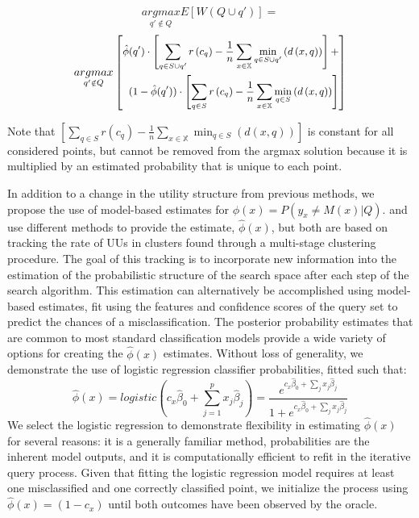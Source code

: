 \documentclass[letterpaper]{article} %
\begin{document}
$$\underset{q' \notin Q}{argmax} E[W(Q \cup q')] = $$
\begin{equation*}
\small
\underset{q' \notin Q}{argmax} \left[\begin{split}
\hat{\phi}(q') \cdot \left[\sum_{q \in S \cup q'} r \left(c_q\right) - \frac{1}{n} \sum_{x \in \mathbb{X}} \min_{q \in S \cup q'}\left(d\left(x,q\right)\right) \right] + \\ 
(1-\hat{\phi}(q')) \cdot \left[\sum_{q \in S} r \left(c_q\right) - \frac{1}{n} \sum_{x \in \mathbb{X}} \min_{q \in S}\left(d\left(x,q\right)\right)\right]  
\end{split}\right]
\end{equation*}
\normalsize

Note that $\left[\sum_{q \in S} r \left(c_q\right) - \frac{1}{n} \sum_{x \in \mathbb{X}} \min_{q \in S}\left(d\left(x,q\right)\right)\right]$ is constant for all considered points, but cannot be removed from the argmax solution because it is multiplied by an estimated probability that is unique to each point. 

In addition to a change in the utility structure from previous methods, we propose the use of model-based estimates for $\phi(x) = P\left(y_x \neq M(x) |Q \right)$. \citet{Lakkaraju2016} and \citet{Bansal2018} use different methods to provide the  estimate, $\hat{\phi}(x)$, but both are based on tracking the rate of UUs in clusters found through a multi-stage clustering procedure. The goal of this tracking is to incorporate new information into the estimation of the probabilistic structure of the search space after each step of the search algorithm. This estimation can alternatively be accomplished using model-based estimates, fit using the features and confidence scores of the query set to predict the chances of a misclassification. The posterior probability estimates that are common to most standard classification models provide a wide variety of options for creating the $\hat{\phi}(x)$ estimates. Without loss of generality, we demonstrate the use of logistic regression classifier probabilities, fitted such that:
$$\hat{\phi}(x) = logistic(c_x\hat{\beta}_0 + \sum_{j=1}^p x_j\hat{\beta}_j) = \frac{e^{c_x\hat{\beta}_0 + \sum_j x_j\hat{\beta}_j}}{1+e^{c_x\hat{\beta}_0 + \sum_j x_j\hat{\beta}_j}}$$
We select the logistic regression to demonstrate flexibility in estimating $\hat{\phi}(x)$ for several reasons: it is a generally familiar method, probabilities are the inherent model outputs, and it is computationally efficient to refit in the iterative query process. Given that fitting the logistic regression model requires at least one misclassified and one correctly classified point, we initialize the process using $\hat{\phi}(x) =(1-c_x)$ until both outcomes have been observed by the oracle.
\end{document}
